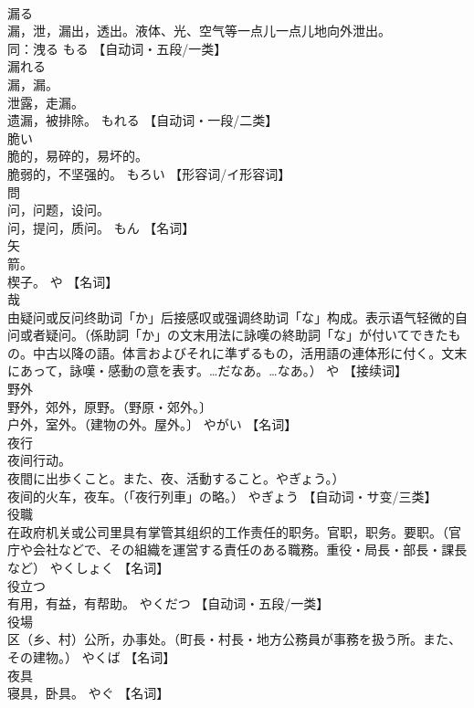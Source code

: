 \documentclass[8pt]{extreport}
\begin{document}
\begin{CJK}{UTF8}{min}
\\	漏る	
\\	漏，泄，漏出，透出。液体、光、空气等一点儿一点儿地向外泄出。 
\\	同：洩る	もる		【自动词・五段/一类】
\\	漏れる	
\\	漏，漏。 
\\	泄露，走漏。 
\\	遗漏，被排除。	もれる		【自动词・一段/二类】
\\	脆い	
\\	脆的，易碎的，易坏的。 
\\	脆弱的，不坚强的。	もろい		【形容词/イ形容词】
\\	問	
\\	问，问题，设问。 
\\	问，提问，质问。	もん		【名词】
\\	矢	
\\	箭。 
\\	楔子。	や		【名词】
\\	哉	
\\	由疑问或反问终助词「か」后接感叹或强调终助词「な」构成。表示语气轻微的自问或者疑问。（係助詞「か」の文末用法に詠嘆の終助詞「な」が付いてできたもの。中古以降の語。体言およびそれに準ずるもの，活用語の連体形に付く。文末にあって，詠嘆・感動の意を表す。…だなあ。…なあ。）	や		【接续词】
\\	野外	
\\	野外，郊外，原野。（野原・郊外。〕 
\\	户外，室外。（建物の外。屋外。〕	やがい		【名词】
\\	夜行	
\\	夜间行动。
\\	夜間に出歩くこと。また、夜、活動すること。やぎょう。） 
\\	夜间的火车，夜车。（「夜行列車」の略。）	やぎょう		【自动词・サ变/三类】
\\	役職	
\\	在政府机关或公司里具有掌管其组织的工作责任的职务。官职，职务。要职。（官庁や会社などで、その組織を運営する責任のある職務。重役・局長・部長・課長など）	やくしょく		【名词】
\\	役立つ	
\\	有用，有益，有帮助。	やくだつ		【自动词・五段/一类】
\\	役場	
\\	区（乡、村）公所，办事处。（町長・村長・地方公務員が事務を扱う所。また、その建物。）	やくば		【名词】
\\	夜具	
\\	寝具，卧具。	やぐ		【名词】

\end{CJK}
\end{document}
